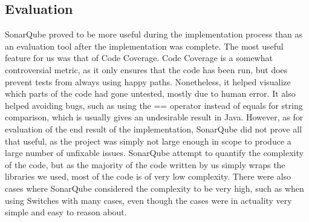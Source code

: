 \documentclass{sigchi-alternate}
\begin{document}
\subsection{Evaluation}
SonarQube proved to be more useful during the implementation process than as an evaluation tool after the implementation was complete. The most useful feature for us was that of Code Coverage. Code Coverage is a somewhat controversial
metric, as it only ensures that the code has been run, but does prevent tests from always using happy paths. Nonetheless, it helped visualize which parts of the code had gone untested, mostly due to human error. It also helped avoiding
bugs, such as using the == operator instead of equals for string comparison, which is usually gives an undesirable result in Java. However, as for evaluation of the end result of the implementation, SonarQube did not prove all that useful,
as the project was simply not large enough in scope to produce a large number of unfixable issues. SonarQube attempt to quantify the complexity of the code, but as the majority of the code written by us simply wraps the libraries we used,
most of the code is of very low complexity. There were also cases where SonarQube considered the complexity to be very high, such as when using Switches with many cases, even though the cases were in actuality very simple and easy to reason about.


%
%
\printbibliography[notcategory=ignore]
\clearpage
\appendixpage
\end{document}
